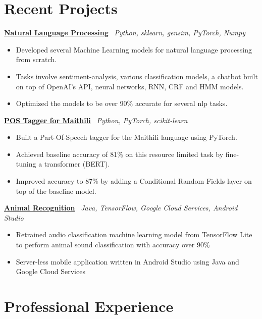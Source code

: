 \documentclass[a4paper,12pt]{article}
\begin{document}
\section{Recent Projects}

\href{https://github.com/kilibarda4/natural-language-processing}{\textbf{Natural Language Processing}} \ \textit{Python, sklearn, gensim, PyTorch, Numpy}
\begin{itemize}[leftmargin=*, nosep]
    \item Developed several Machine Learning models for natural language processing from scratch.
    \item Tasks involve sentiment-analysis, various classification models, a chatbot built on top of OpenAI's API, neural networks, RNN, CRF and HMM models.
    \item Optimized the models to be over 90\% accurate for several nlp tasks.
\end{itemize}

\href{https://github.com/kilibarda4/pos-tagger-Maithili}{\textbf{POS Tagger for Maithili}} \ \textit{Python, PyTorch, scikit-learn}
\begin{itemize}[leftmargin=*, nosep]
    \item Built a Part-Of-Speech tagger for the Maithili language using PyTorch.
    \item Achieved baseline accuracy of 81\% on this resource limited task by fine-tuning a transformer (BERT).
    \item Improved accuracy to 87\% by adding a Conditional Random Fields layer on top of the baseline model.
\end{itemize}

\href{https://github.com/kilibarda4/animal-recognition-android}{\textbf{Animal Recognition}} \ \textit{Java, TensorFlow, Google Cloud Services, Android Studio}
\begin{itemize}[leftmargin=*, nosep]
    \item Retrained audio classification machine learning model from TensorFlow Lite to perform animal sound classification with accuracy over 90\%
    \item Server-less mobile application written in Android Studio using Java and Google Cloud Services
\end{itemize}
\section{Professional Experience}
\end{document}
